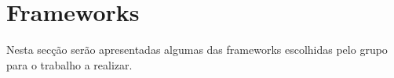 \chapter{Frameworks}
\label{sec:frameworks}

Nesta secção serão apresentadas algumas das frameworks escolhidas pelo grupo para o trabalho a realizar.

% 


% 

% 